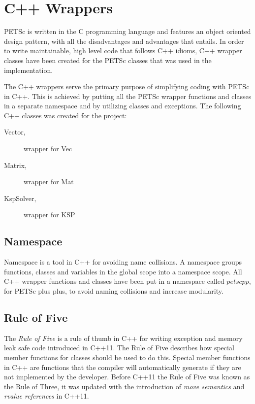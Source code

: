 \section{C++ Wrappers}

PETSc is written in the C programming language and features an object oriented
design pattern, with all the disadvantages and advantages that entails. In order
to write maintainable, high level code that follows C++ idioms, C++ wrapper
classes have been created for the PETSc classes that was used in the
implementation.

The C++ wrappers serve the primary purpose of simplifying coding with PETSc in
C++. This is achieved by putting all the PETSc wrapper functions and classes in
a separate namespace and by utilizing classes and exceptions. The following C++
classes was created for the project:
\begin{description}
	\item[Vector,] wrapper for Vec
	\item[Matrix,] wrapper for Mat
	\item[KspSolver,] wrapper for KSP
\end{description}

\subsection{Namespace}

Namespace is a tool in C++ for avoiding name collisions. A namespace groups
functions, classes and variables in the global scope into a namespace scope.
All C++ wrapper functions and classes have been put in a namespace called
$petscpp$, for PETSc plus plus, to avoid naming collisions and increase
modularity.

\subsection{Rule of Five}

The \emph{Rule of Five} is a rule of thumb in C++ for writing exception and
memory leak safe code introduced in C++11. The Rule of Five describes how 
special member functions for classes should be used to do this. Special member
functions in C++ are functions that the compiler will automatically generate if
they are not implemented by the developer. Before C++11 the Rule of Five was
known as the Rule of Three, it was updated with the introduction of \emph{move
semantics} and \emph{rvalue references} in C++11.

